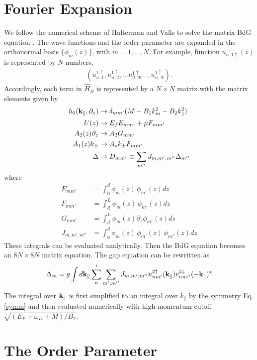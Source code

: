 \section{Fourier Expansion}
We follow the numerical scheme of Halterman and Valls to solve 
the matrix BdG equation \cite{h-v}. The wave functions and the order parameter
are expanded in the orthonormal basis $\{\phi_m(z)\}$, with $m=1,...,N$. For example,
function $u_{n,1\uparrow}(z)$ is represented by $N$ numbers,
\begin{align*}
(u^{1\uparrow}_{n,1},u^{1\uparrow}_{n,2},...u^{1\uparrow}_{n,m}...,u^{1\uparrow}_{n,N}).
\end{align*}
Accordingly, each term in $\hat{H}_{B}$ is represented
by a $N\times N$ matrix with the matrix elements given by
\begin{align*}
h_0(\mathbf{k}_\parallel,\partial_z) &\rightarrow \delta_{mm'}(M - B_1 k_m^2 - B_2 k_\parallel^2) \\
U(z) &\rightarrow E_f E_{mm'} + \mu F_{mm'} \\
 A_2(z) \partial_z &\rightarrow A_2 G_{mm'}\\
 A_1(z) k_\pm &\rightarrow A_z k_\pm F_{mm'} \\
 \Delta &\rightarrow D_{mm'}\equiv \sum_{m''}J_{m,m',m''}\Delta_{m''}
\end{align*}
where 
\begin{align*}
E_{mm'}&=\int_0^{d} \phi_m(z) \, \phi_{m'}(z) dz \\
F_{mm'}&=\int_d^{L} \phi_m(z) \, \phi_{m'}(z) dz \\
G_{mm'}&=\int_d^{L} \phi_m(z) \partial_z \phi_{m'}(z) dz\\
J_{m,m',m''}&=\int_0^{d} \phi_m(z) \, \phi_{m'}(z) \, \phi_{m''}(z) dz
\end{align*}
These integrals can be evaluated analytically. Then the BdG equation becomes
an $8N\times 8N$ matrix equation. The gap equation can be rewritten as
\[
\Delta_{m}=g\int d\mathbf{k}_\parallel \sum'_n \sum_{m',m''} J_{m,m',m''}
u^{2\uparrow}_{nm'}(\mathbf{k}_\parallel)v^{2\downarrow}_{nm''}(-\mathbf{k}_\parallel)^* 
\]
The integral over $\mathbf{k}_\parallel$ is first simplified to an integral over $k_\parallel$
by the symmetry Eq. \eqref{symm} and then evaluated numerically with high 
momentum cutoff 
$\sqrt{(E_F+\omega_D+M)/B_2}$.


\section{The Order Parameter}

